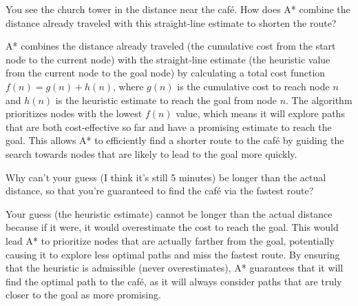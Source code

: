 \begin{ejercicio}[Procedure]
    You see the church tower in the distance near the café. How does A* combine the distance already traveled with this straight-line estimate to shorten the route?

    A* combines the distance already traveled (the cumulative cost from the start node to the current node) with the straight-line estimate (the heuristic value from the current node to the goal node) by calculating a total cost function $f(n) = g(n) + h(n)$, where $g(n)$ is the cumulative cost to reach node $n$ and $h(n)$ is the heuristic estimate to reach the goal from node $n$. The algorithm prioritizes nodes with the lowest $f(n)$ value, which means it will explore paths that are both cost-effective so far and have a promising estimate to reach the goal. This allows A* to efficiently find a shorter route to the café by guiding the search towards nodes that are likely to lead to the goal more quickly.
\end{ejercicio}
\begin{ejercicio}
    Why can't your guess (I think it's still 5 minutes) be longer than the actual distance, so that you're guaranteed to find the café via the fastest route?

    Your guess (the heuristic estimate) cannot be longer than the actual distance because if it were, it would overestimate the cost to reach the goal. This would lead A* to prioritize nodes that are actually farther from the goal, potentially causing it to explore less optimal paths and miss the fastest route. By ensuring that the heuristic is admissible (never overestimates), A* guarantees that it will find the optimal path to the café, as it will always consider paths that are truly closer to the goal as more promising.
\end{ejercicio}



